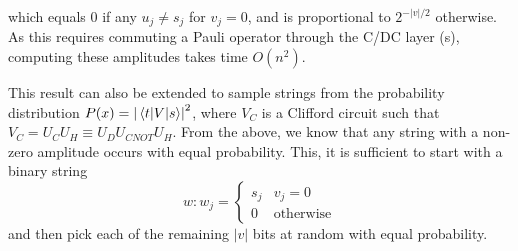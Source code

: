 which equals $0$ if any $u_{j}\neq s_{j}$ for $v_{j}=0$, and is proportional to $2^{-\left\vert v\right\vert/2}$ otherwise. As this requires commuting a Pauli operator through the C/DC layer (s), computing these amplitudes takes time $O(n^{2})$.\par
This result can also be extended to sample strings from the probability distribution $P(x)=\left\vert\matrixel{t}{V}{s}\right\vert^{2}$, where $V_{C}$ is a Clifford circuit such that $V_{C}=U_{C}U_{H}\equiv U_{D}U_{CNOT}U_{H}$. From the above, we know that any string with a non-zero amplitude occurs with equal probability. This, it is sufficient to start with a binary string
\[w:w_{j}=\begin{cases}s_{j} & v_{j}=0 \\ 0 & \text{otherwise}\end{cases}\]
and then pick each of the remaining $\left\vert v\right\vert$ bits at random with equal probability.
